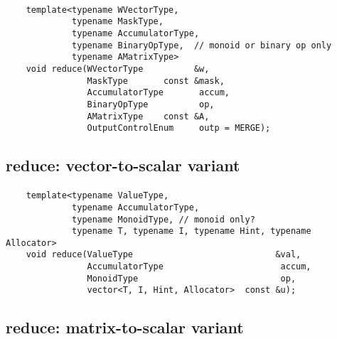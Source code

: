 \paragraph{\syntax}

\begin{verbatim}
    template<typename WVectorType,
             typename MaskType,
             typename AccumulatorType,
             typename BinaryOpType,  // monoid or binary op only
             typename AMatrixType>
    void reduce(WVectorType          &w,
                MaskType       const &mask,
                AccumulatorType       accum,
                BinaryOpType          op,
                AMatrixType    const &A,
                OutputControlEnum     outp = MERGE);
\end{verbatim}


\subsection{{\sf reduce}: vector-to-scalar variant}

\paragraph{\syntax}

\begin{verbatim}
    template<typename ValueType,
             typename AccumulatorType,
             typename MonoidType, // monoid only?
             typename T, typename I, typename Hint, typename Allocator>
    void reduce(ValueType                            &val,
                AccumulatorType                       accum,
                MonoidType                            op,
                vector<T, I, Hint, Allocator>  const &u);
\end{verbatim}


\subsection{{\sf reduce}: matrix-to-scalar variant}


\paragraph{\syntax}

